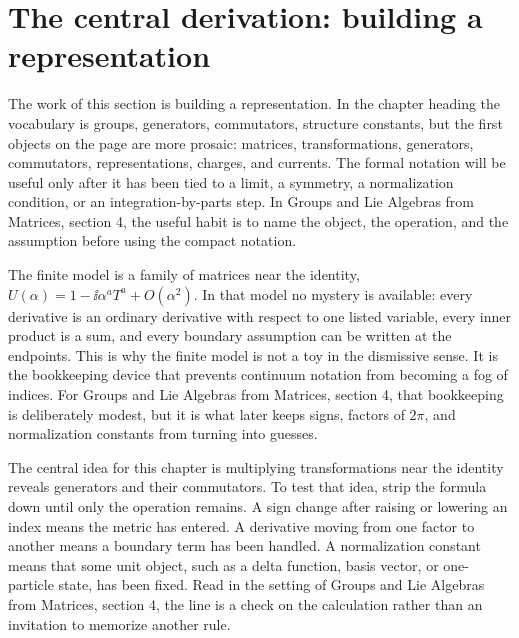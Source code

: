 \section{The central derivation: building a representation}













The work of this section is building a representation.  In the chapter heading the vocabulary is groups, generators, commutators, structure constants, but the first objects on the page are more prosaic: matrices, transformations, generators, commutators, representations, charges, and currents.  The formal notation will be useful only after it has been tied to a limit, a symmetry, a normalization condition, or an integration-by-parts step.  In Groups and Lie Algebras from Matrices, section 4, the useful habit is to name the object, the operation, and the assumption before using the compact notation.

The finite model is a family of matrices near the identity, \(U(\alpha)=1-\ii\alpha^aT^a+O(\alpha^2)\).  In that model no mystery is available: every derivative is an ordinary derivative with respect to one listed variable, every inner product is a sum, and every boundary assumption can be written at the endpoints.  This is why the finite model is not a toy in the dismissive sense.  It is the bookkeeping device that prevents continuum notation from becoming a fog of indices.  For Groups and Lie Algebras from Matrices, section 4, that bookkeeping is deliberately modest, but it is what later keeps signs, factors of \(2\pi\), and normalization constants from turning into guesses.

The central idea for this chapter is multiplying transformations near the identity reveals generators and their commutators.  To test that idea, strip the formula down until only the operation remains.  A sign change after raising or lowering an index means the metric has entered.  A derivative moving from one factor to another means a boundary term has been handled.  A normalization constant means that some unit object, such as a delta function, basis vector, or one-particle state, has been fixed.  Read in the setting of Groups and Lie Algebras from Matrices, section 4, the line is a check on the calculation rather than an invitation to memorize another rule.

